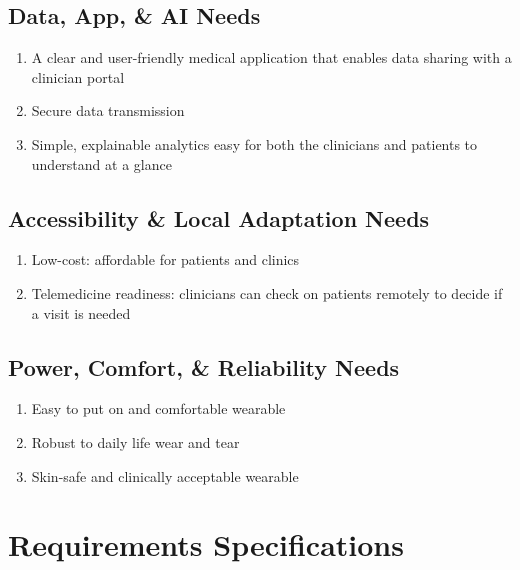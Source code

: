     \subsection{Data, App, \& AI Needs}
    \begin{enumerate}
        \item A clear and user-friendly medical application that enables data sharing with a clinician portal
        \item Secure data transmission
        \item Simple, explainable analytics easy for both the clinicians and patients to understand at a glance
    \end{enumerate}

    \subsection{Accessibility \& Local Adaptation Needs}
    \begin{enumerate}
        \item Low-cost: affordable for patients and clinics
        \item Telemedicine readiness: clinicians can check on patients remotely to decide if a visit is needed
    \end{enumerate}

    \subsection{Power, Comfort, \& Reliability Needs}
    \begin{enumerate}
        \item Easy to put on and comfortable  wearable
        \item Robust to daily life wear and tear
        \item Skin-safe and clinically acceptable wearable
    \end{enumerate}

\section{Requirements Specifications} 


